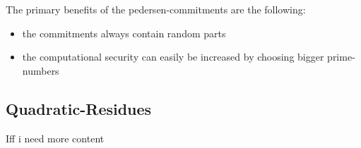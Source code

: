 The primary benefits of the pedersen-commitments are the following: 
\begin{itemize}
	\item the commitments always contain random parts
	\item the computational security can easily be increased by choosing bigger prime-numbers
\end{itemize}

\subsection{Quadratic-Residues}
Iff i need more content
